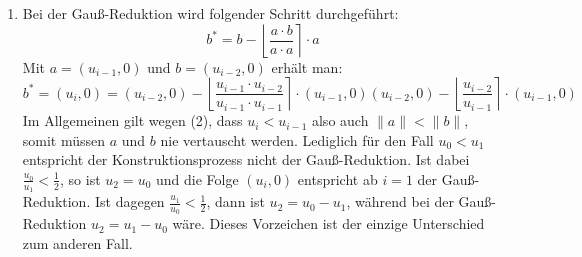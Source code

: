 \begin{enumerate}[(1)]
	\item Bei der Gauß-Reduktion wird folgender Schritt durchgeführt:
	\[ b^* = b - \left\lfloor \frac{a \cdot b}{a \cdot a} \right\rceil \cdot a \]
	Mit $a = (u_{i-1}, 0)$ und $b = (u_{i-2}, 0)$ erhält man:
	\[ b^* = (u_i,0) = (u_{i-2},0) - \left\lfloor \frac{u_{i-1} \cdot
	u_{i-2}}{u_{i-1} \cdot u_{i-1} } \right\rceil \cdot (u_{i-1}, 0)
	(u_{i-2},0) - \left\lfloor \frac{u_{i-2}}{u_{i-1}} \right\rceil \cdot
	(u_{i-1}, 0)\]
	Im Allgemeinen gilt wegen (2), dass $u_i < u_{i-1}$ also auch $\|a\| <
	\|b\|$, somit müssen $a$ und $b$ nie vertauscht werden. Lediglich für
	den Fall $u_0 < u_1$ entspricht der Konstruktionsprozess nicht der
	Gauß-Reduktion. Ist dabei $\frac{u_0}{u_1} < \frac{1}{2}$, so ist $u_2
	= u_0$ und die Folge $(u_i, 0)$ entspricht ab $i = 1$ der
	Gauß-Reduktion. Ist dagegen $\frac{u_1}{u_0} < \frac{1}{2}$, dann ist
	$u_2 = u_0 - u_1$, während bei der Gauß-Reduktion $u_2 = u_1 - u_0$
	wäre. Dieses Vorzeichen ist der einzige Unterschied zum anderen Fall.
\end{enumerate}
